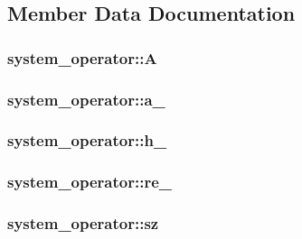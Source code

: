 \subsection{Member Data Documentation}
\hypertarget{structsystem__operator_ad65d4629ea6454c220afcf8ae37e7056}{
\subsubsection[{A}]{ system\-\_\-operator\-::\-A}}\label{structsystem__operator_ad65d4629ea6454c220afcf8ae37e7056}
\hypertarget{structsystem__operator_a56a3b4eb15af35520fd5e7f7c53e9867}{
\subsubsection[{a\-\_\-}]{ system\-\_\-operator\-::a\-\_\-}}\label{structsystem__operator_a56a3b4eb15af35520fd5e7f7c53e9867}
\hypertarget{structsystem__operator_a67111e362063fae7530d24c73a24e8ec}{
\subsubsection[{h\-\_\-}]{ system\-\_\-operator\-::h\-\_\-}}\label{structsystem__operator_a67111e362063fae7530d24c73a24e8ec}
\hypertarget{structsystem__operator_af9bc7a7d8dd1c6f5ad512d991ba89c6b}{
\subsubsection[{re\-\_\-}]{ system\-\_\-operator\-::re\-\_\-}}\label{structsystem__operator_af9bc7a7d8dd1c6f5ad512d991ba89c6b}
\hypertarget{structsystem__operator_a62ee884c4912594a527b51645c50f703}{
\subsubsection[{sz}]{ system\-\_\-operator\-::sz}}\label{structsystem__operator_a62ee884c4912594a527b51645c50f703}
